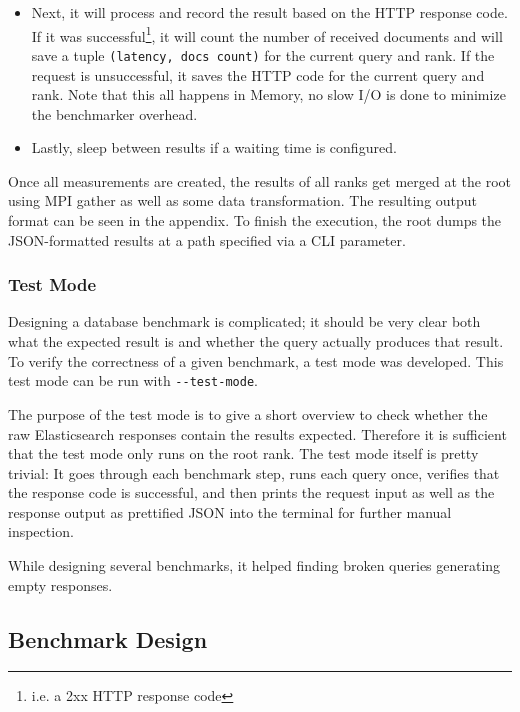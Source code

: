 \begin{itemize}
\begin{itemize}
      \item Next, it will process and record the result based on the HTTP response code. If it was successful\footnote{i.e. a 2xx HTTP response code}, it will count the number of received documents and will save a tuple \texttt{(latency, docs count)} for the current query and rank. If the request is unsuccessful, it saves the HTTP code for the current query and rank. Note that this all happens in Memory, no slow I/O is done to minimize the benchmarker overhead.
      \item Lastly, sleep between results if a waiting time is configured.
    \end{itemize}
\end{itemize}

Once all measurements are created, the results of all ranks get merged at the root using \ac{MPI} gather as well as some data transformation. The resulting output format can be seen in the appendix. To finish the execution, the root dumps the JSON-formatted results at a path specified via a \ac{CLI} parameter.

\subsubsection{Test Mode}
Designing a database benchmark is complicated; it should be very clear both what the expected result is and whether the query actually produces that result. To verify the correctness of a given benchmark, a test mode was developed. This test mode can be run with \texttt{-{}-test-mode}.

The purpose of the test mode is to give a short overview to check whether the raw Elasticsearch responses contain the results expected. Therefore it is sufficient that the test mode only runs on the root rank. The test mode itself is pretty trivial: It goes through each benchmark step, runs each query once, verifies that the response code is successful, and then prints the request input as well as the response output as prettified JSON into the terminal for further manual inspection.

While designing several benchmarks, it helped finding broken queries generating empty responses.

\subsection{Benchmark Design}

